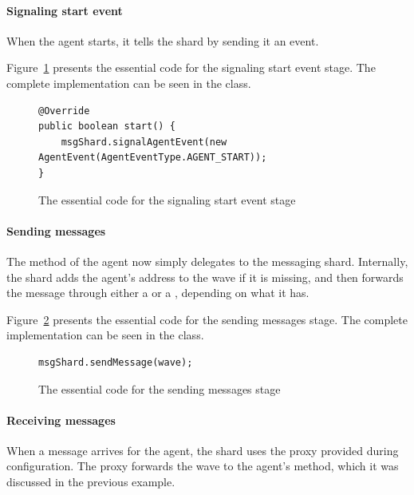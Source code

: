 \documentclass{article}
\begin{document}
\paragraph{Signaling start event} 

When the agent starts, it tells the shard by sending it an  event. 

Figure~\ref{fig:func:startPingPongAgent:code} presents the essential code for the signaling start event stage. The complete implementation can be seen in the  class.

\begin{figure}[ht]\centering
\begin{lstlisting}
@Override
public boolean start() {
    msgShard.signalAgentEvent(new AgentEvent(AgentEventType.AGENT_START));
}
\end{lstlisting}
\caption{The essential code for the signaling start event stage}\label{fig:func:startPingPongAgent:code}
\end{figure}

\paragraph{Sending messages} 

The  method of the agent now simply delegates to the messaging shard. Internally, the shard adds the agent’s address to the wave if it is missing, and then forwards the message through either a  or a , depending on what it has.

Figure~\ref{fig:func:sendPingPongAgent:code} presents the essential code for the sending messages stage. The complete implementation can be seen in the  class.

\begin{figure}[ht]\centering
\begin{lstlisting}
msgShard.sendMessage(wave);
\end{lstlisting}
\caption{The essential code for the sending messages stage}\label{fig:func:sendPingPongAgent:code}
\end{figure}

\paragraph{Receiving messages} 

When a message arrives for the agent, the shard uses the proxy provided during configuration. The proxy forwards the wave to the agent’s  method, which it was discussed in the previous example.
\end{document}
